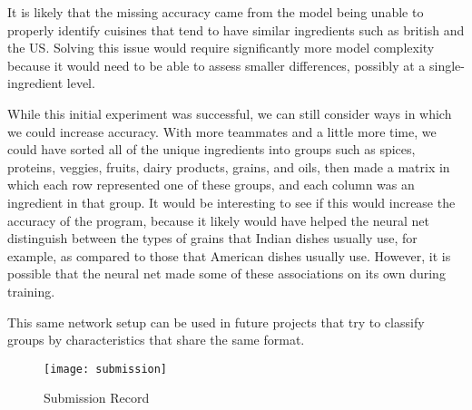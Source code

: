 \documentclass[11pt]{article}
\begin{document}
It is likely that the missing accuracy came from the model being unable to properly identify cuisines that tend to have similar ingredients such as british and the US. Solving this issue would require significantly more model complexity because it would need to be able to assess smaller differences, possibly at a single-ingredient level.

While this initial experiment was successful, we can still consider ways in which we could increase accuracy. With more teammates and a little more time, we could have sorted all of the unique ingredients into groups such as spices, proteins, veggies, fruits, dairy products, grains, and oils, then made a matrix in which each row represented one of these groups, and each column was an ingredient in that group. It would be interesting to see if this would increase the accuracy of the program, because it likely would have helped the neural net distinguish between the types of grains that Indian dishes usually use, for example, as compared to those that American dishes usually use. However, it is possible that the neural net made some of these associations on its own during training. 

This same network setup can be used in future projects that try to classify groups by characteristics that share the same format. 

\begin{figure}
\caption{Submission Record}
\texttt{[image: submission]}
\centering
\end{figure}
\end{document}
